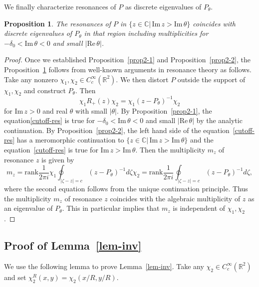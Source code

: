 \documentclass{article}
\theoremstyle{plain}
\newtheorem{prop}{Proposition}[section]
\theoremstyle{definition}
\theoremstyle{remark}
\newcommand{\RR}{\mathbb{R}}
\newcommand{\CC}{\mathbb{C}}
\newcommand{\Cinf}{C^{\infty}}
\newcommand{\RE}{\mathrm{Re}\,}
\newcommand{\IM}{\mathrm{Im}\,}
\begin{document}
We finally characterize resonances of $P$ as discrete eigenvalues of $P_{\theta}$. 
\begin{prop}\label{prop2-3}
The resonances of $P$ in $\{z\in \CC|\, \IM z>\IM \theta\}$ 
coincides with discrete eigenvalues of $P_{\theta}$ in that region including multiplicities 
for $-\delta_0 <\IM \theta<0$ and small $|\RE \theta|$. 
\end{prop}
\begin{proof}
Once we established Proposition~\ref{prop2-1} and Proposition~\ref{prop2-2}, 
the Proposition~\ref{prop2-3} follows from well-known arguments in resonance theory as follows.  
Take any nonzero $\chi_1, \chi_2\in \Cinf_c(\RR^2)$. 
We then distort $P$ outside the support of $\chi_1, \chi_2$ and construct $P_{\theta}$. 
Then 
\begin{equation}\label{cutoff-res}
\chi_1 R_{+}(z)\chi_2=\chi_1 (z-P_{\theta})^{-1}\chi_2
\end{equation} 
for $\IM z>0$ and real $\theta$ with small $|\theta|$. 
By Proposition~\ref{prop2-1}, the equation\eqref{cutoff-res} is true for 
$-\delta_0<\IM \theta<0$ and small $|\RE \theta|$ by the analytic continuation. 
By Proposition~\ref{prop2-2}, the left hand side of the equation~\eqref{cutoff-res} has a meromorphic continuation 
to $\{z\in \CC|\, \IM z>\IM \theta\}$ and the equation~\eqref{cutoff-res} is true for $\IM z>\IM \theta$. 
Then the multiplicity $m_z$ of resonance $z$ is given by 
\[
m_z=\mathrm{rank}\frac{1}{2\pi i}\chi_1 \oint_{|\zeta-z|=c} (z-P_{\theta})^{-1}  d\zeta \chi_2
=\mathrm{rank}\frac{1}{2\pi i}\oint_{|\zeta-z|=c} (z-P_{\theta})^{-1} d\zeta, 
\]
where the second equation follows from the unique continuation principle. 
Thus the multiplicity $m_z$ of resonance $z$ coincides with the algebraic multiplicity of $z$ as an eigenvalue of $P_{\theta}$.  
This in particular implies that $m_z$ is independent of $\chi_1, \chi_2$. 
\end{proof}














\subsection{Proof of Lemma~\ref{lem-inv}}
We use the following lemma to prove Lemma~\ref{lem-inv}. 
Take any $\chi_2 \in \Cinf_c(\RR^2)$ and set $\chi_2^R(x, y)=\chi_2(x/R, y/R)$. 
\end{document}
